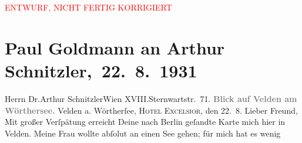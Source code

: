 
\begin{center}
            \textcolor{red}{ENTWURF, NICHT FERTIG KORRIGIERT}
                      \end{center}
            
         
         \renewcommand{\erwaehntePersonen}{Personen: Eva Marie Goldmann}
         \renewcommand{\erwaehnteOrte}{Orte: Berlin, Gmunden, Hotel Excelsior, Kärnten, Sternwartestraße 71, Velden am Wörthersee, Wien, XVIII., Währing}
         \renewcommand{\erwaehnteWerke}{}
               \section[ Paul Goldmann an Arthur Schnitzler, 22. 8. 1931]{ Paul Goldmann an Arthur Schnitzler, 22. 8. 1931}\nopagebreak{}\rehead{ }\begin{ledgroupsized}[t]{13cm}\normalsize\beginnumbering \toendnotes[C]{\smallbreak\pagebreak[2]} 
\toendnotes[C]{\smallbreak}\pstart{}{\pb}Herrn Dr.\pend{}\pstart{}Arthur Schnitzler\pend{}\pstart{}Wien XVIII.\pend{}\pstart{}Sternwartstr. 71.\pend{}{\bigskip}\pstart
           \noindent{}\centering{}{\pb}\textcolor{gray}{\textbf{Blick auf Velden am
                        Wörthersee.}}\pend
           \pstart
           Velden a. Wörtherſee, \textsc{Hotel Excelsior}, den 22. 8.\pend
           \pstart
           Lieber Freund, Mit großer Verſpätung erreicht Deine
               nach Berlin geſandte Karte mich hier in Velden. Meine Frau wollte abſolut an einen See gehen; für mich hat es wenig

\end{ledgroupsized}
